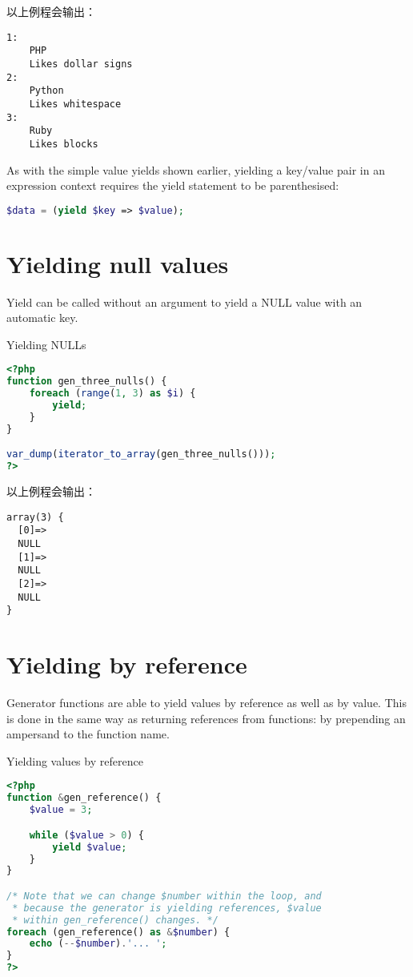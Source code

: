 以上例程会输出：

\begin{verbatim}
1:
    PHP
    Likes dollar signs
2:
    Python
    Likes whitespace
3:
    Ruby
    Likes blocks
\end{verbatim}

As with the simple value yields shown earlier, yielding a key/value pair in an expression context requires the yield statement to be parenthesised:

\begin{lstlisting}[language=PHP]
$data = (yield $key => $value);
\end{lstlisting}


\section{Yielding null values}

Yield can be called without an argument to yield a NULL value with an automatic key.


\begin{example}
Yielding NULLs
\begin{lstlisting}[language=PHP]
<?php
function gen_three_nulls() {
    foreach (range(1, 3) as $i) {
        yield;
    }
}

var_dump(iterator_to_array(gen_three_nulls()));
?>
\end{lstlisting}
\end{example}

以上例程会输出：

\begin{verbatim}
array(3) {
  [0]=>
  NULL
  [1]=>
  NULL
  [2]=>
  NULL
}
\end{verbatim}


\section{Yielding by reference}

Generator functions are able to yield values by reference as well as by value. This is done in the same way as returning references from functions: by prepending an ampersand to the function name.

\begin{example}
Yielding values by reference
\begin{lstlisting}[language=PHP]
<?php
function &gen_reference() {
    $value = 3;

    while ($value > 0) {
        yield $value;
    }
}

/* Note that we can change $number within the loop, and
 * because the generator is yielding references, $value
 * within gen_reference() changes. */
foreach (gen_reference() as &$number) {
    echo (--$number).'... ';
}
?>
\end{lstlisting}
\end{example}

